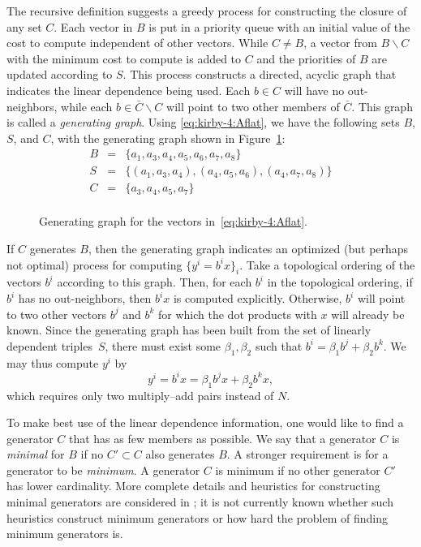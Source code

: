 The recursive definition suggests a greedy process for constructing
the closure of any set $ C $. Each vector in $B$ is put in a priority
queue with an initial value of the cost to compute independent of other
vectors. While $C \ne B$, a vector from $B \backslash C$ with the
minimum cost to compute is added to $C$ and the priorities of $B$ are
updated according to $S$. This process constructs a directed, acyclic
graph that indicates the linear dependence being used. Each $ b \in C
$ will have no out-neighbors, while each $ b \in \bar{C} \backslash C
$ will point to two other members of $ \bar{C} $. This graph is
called a \emph{generating graph}. Using \eqref{eq:kirby-4:Aflat}, we
have the following sets $B$, $S$, and $C$, with the generating graph
shown in Figure~\ref{fig:kirby-4:gg}:
\begin{equation}
\begin{array}{rcl}
 B & = &  \{a_1, a_3, a_4, a_5, a_6, a_7, a_8\} \\
 S & = & \{(a_1, a_3, a_4),(a_4, a_5, a_6), (a_4, a_7, a_8)\} \\
 C & = & \{a_3, a_4, a_5, a_7\} \\
\end{array}
\end{equation}

\begin{figure}
  \centering
  \caption{Generating graph for the vectors in~\eqref{eq:kirby-4:Aflat}.}
  \label{fig:kirby-4:gg}
\end{figure}

If $C$ generates $B$, then the generating graph indicates an optimized
(but perhaps not optimal) process for computing $\{ y^i = b^i x \}_i$.
Take a topological ordering of the vectors $b^i$ according to this
graph. Then, for each $b^i$ in the topological ordering, if $b^i$ has
no out-neighbors, then $b^i x$ is computed explicitly. Otherwise,
$b^i$ will point to two other vectors $b^j$ and $b^k$ for which the
dot products with $x$ will already be known. Since the generating
graph has been built from the set of linearly dependent triples~$S$,
there must exist some $\beta_1, \beta_2$ such that $b^i = \beta_1 b^j
+ \beta_2 b^k$. We may thus compute $y^i$ by
\begin{equation}
y^i = b^i x = \beta_1 b^j x
+ \beta_2  b^k  x,
\end{equation}
which requires only two multiply--add pairs instead of $ N $.

To make best use of the linear dependence information, one would like
to find a generator $C$ that has as few members as possible. We
say that a generator $C$ is \emph{minimal} for $B$ if no $C'
\subset C$ also generates $B$. A stronger requirement is for a
generator to be \emph{minimum}. A generator $C$ is minimum if no other
generator $C'$ has lower cardinality. More complete details and
heuristics for constructing minimal generators are considered
in \citet{KirbyScott2007}; it is not currently known whether such
heuristics construct minimum generators or how hard the problem of
finding minimum generators is.

